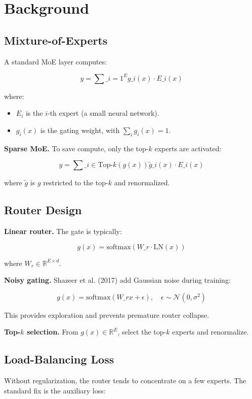 \section{Background}

\subsection{Mixture-of-Experts}

A standard MoE layer computes:

\[
y = \sum\_{i=1}^{E} g\_i(x) \cdot E\_i(x)
\tag{3.1}
\]

where:
\begin{itemize}
\item $E_i$ is the $i$-th expert (a small neural network).
\item $g_i(x)$ is the gating weight, with $\sum_i g_i(x) = 1$.

\end{itemize}
\textbf{Sparse MoE.} To save compute, only the top-$k$ experts are activated:

\[
y = \sum\_{i \in \text{Top-}k(g(x))} \tilde{g}\_i(x) \cdot E\_i(x)
\tag{3.2}
\]

where $\tilde{g}$ is $g$ restricted to the top-$k$ and renormalized.

\subsection{Router Design}

\textbf{Linear router.} The gate is typically:

\[
g(x) = \text{softmax}(W\_r \cdot \text{LN}(x))
\tag{3.3}
\]

where $W_r \in \mathbb{R}^{E \times d}$.

\textbf{Noisy gating.} Shazeer et al. (2017) add Gaussian noise during training:

\[
g(x) = \text{softmax}(W\_r x + \epsilon), \quad \epsilon \sim \mathcal{N}(0, \sigma^2)
\tag{3.4}
\]

This provides exploration and prevents premature router collapse.

\textbf{Top-$k$ selection.} From $g(x) \in \mathbb{R}^E$, select the top-$k$ experts 
and renormalize.

\subsection{Load-Balancing Loss}

Without regularization, the router tends to concentrate on a few experts. 
The standard fix is the auxiliary loss:

